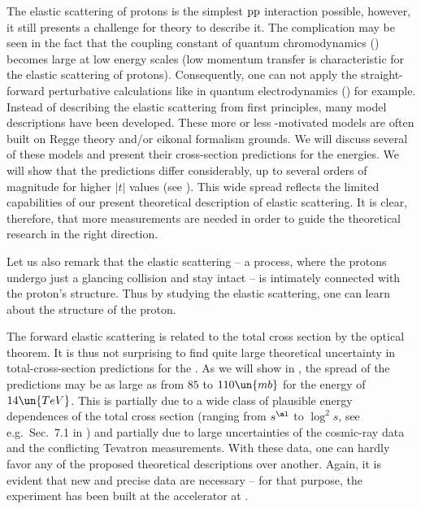 \def\CaptionPrefix{I.}


The elastic scattering of protons is the simplest $\rm pp$ interaction possible, however, it still presents a challenge for theory to describe it. The complication may be seen in the fact that the coupling constant of quantum chromodynamics () becomes large at low energy scales (low momentum transfer is characteristic for the elastic scattering of protons). Consequently, one can not apply the straight-forward perturbative calculations like in quantum electrodynamics () for example. Instead of describing the elastic scattering from first principles, many model descriptions have been developed. These more or less -motivated models are often built on Regge theory and/or eikonal formalism grounds. We will discuss several of these models and present their cross-section predictions for the  energies. We will show that the predictions differ considerably, up to several orders of magnitude for higher $|t|$ values (see ). This wide spread reflects the limited capabilities of our present theoretical description of elastic scattering. It is clear, therefore, that more measurements are needed in order to guide the theoretical research in the right direction.

Let us also remark that the elastic scattering -- a process, where the protons undergo just a glancing collision and stay intact -- is intimately connected with the proton's structure. Thus by studying the elastic scattering, one can learn about the structure of the proton.

The forward elastic scattering is related to the total cross section by the optical theorem. It is thus not surprising to find quite large theoretical uncertainty in total-cross-section predictions for the . As we will show in , the spread of the predictions may be as large as from $85$ to $110\un{mb}$ for the energy of $14\un{TeV}$. This is partially due to a wide class of plausible energy dependences of the total cross section (ranging from $s^{\al}$ to $\log^2 s$, see e.g.~Sec.~7.1 in ) and partially due to large uncertainties of the cosmic-ray data and the conflicting Tevatron measurements. With these data, one can hardly favor any of the proposed theoretical descriptions over another. Again, it is evident that new and precise data are necessary -- for that purpose, the  experiment has been built at the  accelerator at .

